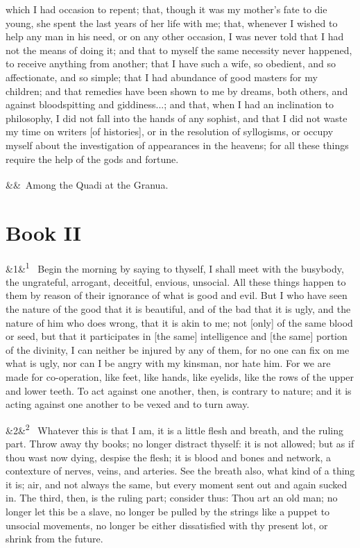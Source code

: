 \documentclass[12pt]{article}
\newcommand{\para}[1][]{\par\noindent\ifx&#1&\else\textsuperscript{\footnotesize #1}~\fi}
\begin{document}
which I had occasion to repent; that, though it was my mother's fate to
die young, she spent the last years of her life with me; that, whenever
I wished to help any man in his need, or on any other occasion, I was
never told that I had not the means of doing it; and that to myself the
same necessity never happened, to receive anything from another; that I
have such a wife, so obedient, and so affectionate, and so simple;
that I had abundance of good masters for my children; and that remedies
have been shown to me by dreams, both others, and against bloodspitting
and giddiness...; and that, when I had an inclination to philosophy,
I did not fall into the hands of any sophist, and that I did not waste
my time on writers [of histories], or in the resolution of syllogisms,
or occupy myself about the investigation of appearances in the heavens;
for all these things require the help of the gods and fortune.

\para Among the Quadi at the Granua.

\section*{Book II}

\para[1] Begin the morning by saying to thyself, I shall meet with the busybody,
the ungrateful, arrogant, deceitful, envious, unsocial. All these things
happen to them by reason of their ignorance of what is good and evil.
But I who have seen the nature of the good that it is beautiful, and of
the bad that it is ugly, and the nature of him who does wrong, that it
is akin to me; not [only] of the same blood or seed, but that it
participates in [the same] intelligence and [the same] portion of the
divinity, I can neither be injured by any of them, for no one can fix on
me what is ugly, nor can I be angry with my kinsman, nor hate him. For
we are made for co-operation, like feet, like hands, like eyelids, like
the rows of the upper and lower teeth. To act against one another,
then, is contrary to nature; and it is acting against one another to be
vexed and to turn away.

\para[2] Whatever this is that I am, it is a little flesh and breath, and the
ruling part. Throw away thy books; no longer distract thyself: it is not
allowed; but as if thou wast now dying, despise the flesh; it is blood
and bones and network, a contexture of nerves, veins, and arteries. See
the breath also, what kind of a thing it is; air, and not always the
same, but every moment sent out and again sucked in. The third, then, is
the ruling part; consider thus: Thou art an old man; no longer let this
be a slave, no longer be pulled by the strings like a puppet to unsocial
movements, no longer be either dissatisfied with thy present lot, or
shrink from the future.
\end{document}
